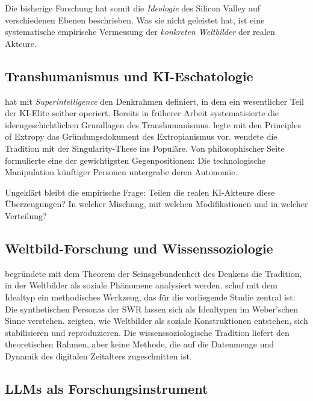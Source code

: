 \documentclass[12pt,a4paper]{article}
\begin{document}
Die bisherige Forschung hat somit die \emph{Ideologie} des Silicon Valley auf verschiedenen Ebenen beschrieben. Was sie nicht geleistet hat, ist eine systematische empirische Vermessung der \emph{konkreten Weltbilder} der realen Akteure.


\subsection{Transhumanismus und KI-Eschatologie}
\label{sec:forschungsstand:transhumanismus}

\citet{Bostrom2014} hat mit \emph{Superintelligence} den Denkrahmen definiert, in dem ein wesentlicher Teil der KI-Elite seither operiert. Bereits in früherer Arbeit systematisierte \citet{Bostrom2005} die ideengeschichtlichen Grundlagen des Transhumanismus. \citet{More2003} legte mit den \glqq Principles of Extropy\grqq{} das Gründungsdokument des Extropianismus vor. \citet{Kurzweil2005} wendete die Tradition mit der Singularity-These ins Populäre. Von philosophischer Seite formulierte \citet{Habermas2001} eine der gewichtigsten Gegenpositionen: Die technologische Manipulation künftiger Personen untergrabe deren Autonomie.

Ungeklärt bleibt die empirische Frage: Teilen die realen KI-Akteure diese Überzeugungen? In welcher Mischung, mit welchen Modifikationen und in welcher Verteilung?


\subsection{Weltbild-Forschung und Wissenssoziologie}
\label{sec:forschungsstand:wissenssoziologie}

\citet{Mannheim1929} begründete mit dem Theorem der \glqq Seinsgebundenheit des Denkens\grqq{} die Tradition, in der Weltbilder als soziale Phänomene analysiert werden. \citet{Weber1904} schuf mit dem Idealtyp ein methodisches Werkzeug, das für die vorliegende Studie zentral ist: Die synthetischen Personas der SWR lassen sich als Idealtypen im Weber'schen Sinne verstehen. \citet{BergerLuckmann1966} zeigten, wie Weltbilder als soziale Konstruktionen entstehen, sich stabilisieren und reproduzieren. Die wissenssoziologische Tradition liefert den theoretischen Rahmen, aber keine Methode, die auf die Datenmenge und Dynamik des digitalen Zeitalters zugeschnitten ist.


\subsection{LLMs als Forschungsinstrument}
\label{sec:forschungsstand:llm}
\end{document}
